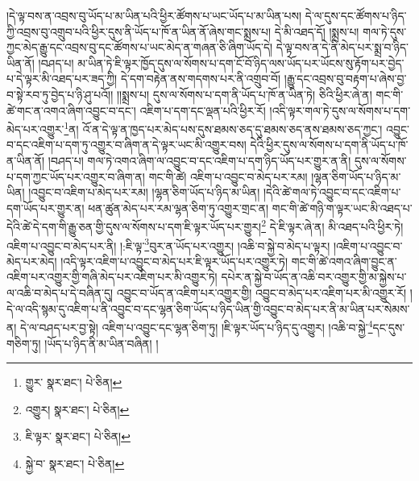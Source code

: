 །དེ་ལྟ་བས་ན་འབྲས་བུ་ཡོད་པ་མ་ཡིན་པའི་ཕྱིར་ཚོགས་པ་ཡང་ཡོད་པ་མ་ཡིན་པས། དེ་ལ་དུས་དང་ཚོགས་པ་ཉིད་ཀྱི་འབྲས་བུ་འགྲུབ་པའི་ཕྱིར་དུས་ནི་ཡོད་པ་ཁོ་ན་ཡིན་ནོ་ཞེས་གང་སྨྲས་པ། དེ་མི་འཐད་དོ། །སྨྲས་པ། གལ་ཏེ་དུས་ཀྱང་མེད་རྒྱུ་དང་འབྲས་བུ་དང་ཚོགས་པ་ཡང་མེད་ན་གཞན་ཅི་ཞིག་ཡོད་དེ། དེ་ལྟ་བས་ན་དེ་ནི་མེད་པར་སྨྲ་བ་ཉིད་ཡིན་ནོ། །བཤད་པ། མ་ཡིན་ཏེ་ཇི་ལྟར་ཁྱོད་དུས་ལ་སོགས་པ་དག་ངོ་བོ་ཉིད་ལས་ཡོད་པར་ཡོངས་སུ་རྟོག་པར་བྱེད་པ་དེ་ལྟར་མི་འཐད་པར་ཟད་ཀྱི། དེ་དག་བརྟེན་ནས་གདགས་པར་ནི་འགྲུབ་བོ། །རྒྱུ་དང་འབྲས་བུ་བརྟག་པ་ཞེས་བྱ་བ་སྟེ་རབ་ཏུ་བྱེད་པ་ཉི་ཤུ་པའོ།། །།སྨྲས་པ། དུས་ལ་སོགས་པ་དག་ནི་ཡོད་པ་ཁོ་ན་ཡིན་ཏེ། ཅིའི་ཕྱིར་ཞེ་ན། གང་གི་ཚེ་གང་ན་འགའ་ཞིག་འབྱུང་བ་དང་། འཇིག་པ་དག་དང་ལྡན་པའི་ཕྱིར་རོ། །འདི་ལྟར་གལ་ཏེ་དུས་ལ་སོགས་པ་དག་མེད་པར་འགྱུར་\footnote{གྱུར་  སྣར་ཐང་།  པེ་ཅིན། }ན། འོ་ན་དེ་ལྟ་ན་ཁྱད་པར་མེད་པས་དུས་ཐམས་ཅད་དུ་ཐམས་ཅད་ནས་ཐམས་ཅད་ཀྱང་། འབྱུང་བ་དང་འཇིག་པ་དག་ཏུ་འགྱུར་བ་ཞིག་ན་དེ་ལྟར་ཡང་མི་འགྱུར་བས། དེའི་ཕྱིར་དུས་ལ་སོགས་པ་དག་ནི་ཡོད་པ་ཁོ་ན་ཡིན་ནོ། །བཤད་པ། གལ་ཏེ་འགའ་ཞིག་ལ་འབྱུང་བ་དང་འཇིག་པ་དག་ཉིད་ཡོད་པར་གྱུར་ན་ནི། དུས་ལ་སོགས་པ་དག་ཀྱང་ཡོད་པར་འགྱུར་བ་ཞིག་ན། གང་གི་ཚེ། འཇིག་པ་འབྱུང་བ་མེད་པར་རམ། །ལྷན་ཅིག་ཡོད་པ་ཉིད་མ་ཡིན། །འབྱུང་བ་འཇིག་པ་མེད་པར་རམ། །ལྷན་ཅིག་ཡོད་པ་ཉིད་མ་ཡིན། །དེའི་ཚེ་གལ་ཏེ་འབྱུང་བ་དང་འཇིག་པ་དག་ཡོད་པར་གྱུར་ན། ཕན་ཚུན་མེད་པར་རམ་ལྷན་ཅིག་ཏུ་འགྱུར་གྲང་ན། གང་གི་ཚེ་གཉི་ག་ལྟར་ཡང་མི་འཐད་པ་དེའི་ཚེ་དེ་དག་གི་རྒྱུ་ཅན་གྱི་དུས་ལ་སོགས་པ་དག་ཇི་ལྟར་ཡོད་པར་གྱུར།\footnote{འགྱུར།  སྣར་ཐང་།  པེ་ཅིན། } དེ་ཇི་ལྟར་ཞེ་ན། མི་འཐད་པའི་ཕྱིར་ཏེ། འཇིག་པ་འབྱུང་བ་མེད་པར་ནི། །:ཇི་ལྟ་\footnote{ཇི་ལྟར་  སྣར་ཐང་།  པེ་ཅིན། }བུར་ན་ཡོད་པར་འགྱུར། །འཆི་བ་སྐྱེ་བ་མེད་པ་ལྟར། །འཇིག་པ་འབྱུང་བ་མེད་པར་མེད། །འདི་ལྟར་འཇིག་པ་འབྱུང་བ་མེད་པར་ཇི་ལྟར་ཡོད་པར་འགྱུར་ཏེ། གང་གི་ཚེ་འགའ་ཞིག་བྱུང་ན་འཇིག་པར་འགྱུར་གྱི་གཞི་མེད་པར་འཇིག་པར་མི་འགྱུར་ཏེ། དཔེར་ན་སྐྱེ་བ་ཡོད་ན་འཆི་བར་འགྱུར་གྱི་མ་སྐྱེས་པ་ལ་འཆི་བ་མེད་པ་དེ་བཞིན་དུ། འབྱུང་བ་ཡོད་ན་འཇིག་པར་འགྱུར་གྱི། འབྱུང་བ་མེད་པར་འཇིག་པར་མི་འགྱུར་རོ། །དེ་ལ་འདི་སྙམ་དུ་འཇིག་པ་ནི་འབྱུང་བ་དང་ལྷན་ཅིག་ཡོད་པ་ཉིད་ཡིན་གྱི་འབྱུང་བ་མེད་པར་ནི་མ་ཡིན་པར་སེམས་ན། དེ་ལ་བཤད་པར་བྱ་སྟེ། འཇིག་པ་འབྱུང་དང་ལྷན་ཅིག་ཏུ། །ཇི་ལྟར་ཡོད་པ་ཉིད་དུ་འགྱུར། །འཆི་བ་སྐྱེ་\footnote{སྐྱེ་བ་  སྣར་ཐང་།  པེ་ཅིན། }དང་དུས་གཅིག་ཏུ། །ཡོད་པ་ཉིད་ནི་མ་ཡིན་བཞིན། །
